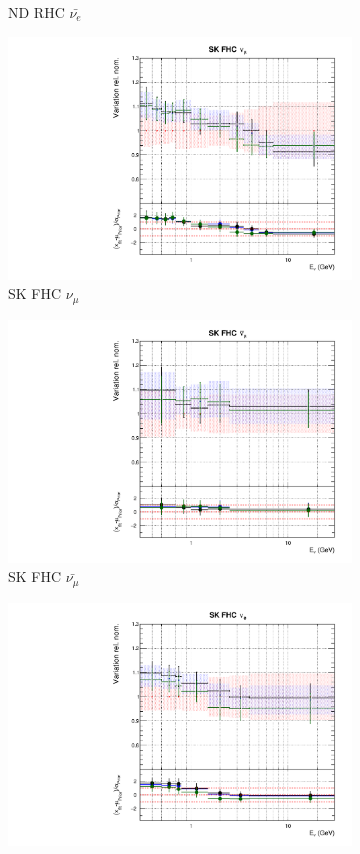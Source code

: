 \begin{figure}
\begin{subfigure}{0.24\textwidth}
  \caption{ND RHC $\bar{\nu_e}$}
\end{subfigure}
\begin{subfigure}{0.24\textwidth}
  \centering
  \includegraphics[width=0.95\linewidth]{figs/newolddatafitsflux_8}
  \caption{SK FHC $\nu_{\mu}$}
\end{subfigure}
\begin{subfigure}{0.24\textwidth}
  \centering
  \includegraphics[width=0.95\linewidth]{figs/newolddatafitsflux_9}
  \caption{SK FHC $\bar{\nu_{\mu}}$}
\end{subfigure}
\begin{subfigure}{0.24\textwidth}
  \centering
  \includegraphics[width=0.95\linewidth]{figs/newolddatafitsflux_10}

\end{subfigure}
\end{figure}
